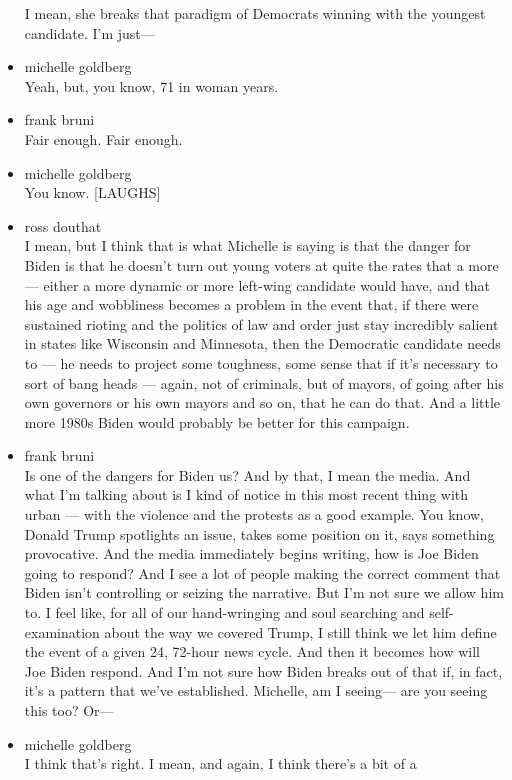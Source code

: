 \begin{itemize}
  I mean, she breaks that paradigm of Democrats winning with the
  youngest candidate. I'm just---
\item
  michelle goldberg\\
  Yeah, but, you know, 71 in woman years.
\item
  frank bruni\\
  Fair enough. Fair enough.
\item
  michelle goldberg\\
  You know. {[}LAUGHS{]}
\item
  ross douthat\\
  I mean, but I think that is what Michelle is saying is that the danger
  for Biden is that he doesn't turn out young voters at quite the rates
  that a more --- either a more dynamic or more left-wing candidate
  would have, and that his age and wobbliness becomes a problem in the
  event that, if there were sustained rioting and the politics of law
  and order just stay incredibly salient in states like Wisconsin and
  Minnesota, then the Democratic candidate needs to --- he needs to
  project some toughness, some sense that if it's necessary to sort of
  bang heads --- again, not of criminals, but of mayors, of going after
  his own governors or his own mayors and so on, that he can do that.
  And a little more 1980s Biden would probably be better for this
  campaign.
\item
  frank bruni\\
  Is one of the dangers for Biden us? And by that, I mean the media. And
  what I'm talking about is I kind of notice in this most recent thing
  with urban --- with the violence and the protests as a good example.
  You know, Donald Trump spotlights an issue, takes some position on it,
  says something provocative. And the media immediately begins writing,
  how is Joe Biden going to respond? And I see a lot of people making
  the correct comment that Biden isn't controlling or seizing the
  narrative. But I'm not sure we allow him to. I feel like, for all of
  our hand-wringing and soul searching and self-examination about the
  way we covered Trump, I still think we let him define the event of a
  given 24, 72-hour news cycle. And then it becomes how will Joe Biden
  respond. And I'm not sure how Biden breaks out of that if, in fact,
  it's a pattern that we've established. Michelle, am I seeing--- are
  you seeing this too? Or---
\item
  michelle goldberg\\
  I think that's right. I mean, and again, I think there's a bit of a

\end{itemize}
